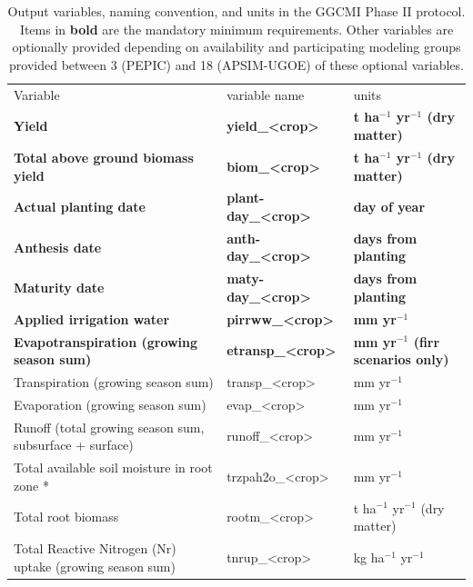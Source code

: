 \documentclass[gmd, manuscript]{copernicus} %
\begin{document}
\begin{table}[]
\caption{Output variables, naming convention, and units in the GGCMI Phase II protocol. Items in \textbf{bold} are the mandatory minimum requirements. Other variables are optionally provided depending on availability and participating modeling groups provided between 3 (PEPIC) and 18 (APSIM-UGOE) of these optional variables.}
\begin{tabular}{lll}
        \tophline \vspace{1mm}
Variable                                & variable name             & units \\
\middlehline \vspace{1mm}
\textbf{Yield}                                   & \textbf{yield\_<crop>}     & \textbf{t ha$^{-1}$ yr$^{-1}$ (dry matter)}\\
\textbf{Total above ground biomass yield}        & \textbf{biom\_<crop>}      & \textbf{t ha$^{-1}$ yr$^{-1}$ (dry matter)}\\
\textbf{Actual planting date}                    & \textbf{plant-day\_<crop>} & \textbf{day of year}\\
\textbf{Anthesis date}                           & \textbf{anth-day\_<crop>}  & \textbf{days from planting} \\
\textbf{Maturity date}                           & \textbf{maty-day\_<crop>}  & \textbf{days from planting}\\
\textbf{Applied irrigation water}                & \textbf{pirrww\_<crop>}    & \textbf{mm yr$^{-1}$} \\
\textbf{Evapotranspiration (growing season sum)} & \textbf{etransp\_<crop>}   & \textbf{mm yr$^{-1}$ (firr scenarios only)}\\ \middlehline
Transpiration (growing season sum)                       & transp\_<crop>    & mm yr$^{-1}$ \\
Evaporation (growing season sum)                         & evap\_<crop>      & mm yr$^{-1}$ \\
Runoff (total growing season sum, subsurface + surface)  & runoff\_<crop>    & mm yr$^{-1}$                    \\
Total available soil moisture in root zone *             & trzpah2o\_<crop>  & mm yr$^{-1}$                    \\
Total root biomass                                       & rootm\_<crop>     & t ha$^{-1}$ yr$^{-1}$ (dry matter)  \\
Total Reactive Nitrogen (Nr) uptake (growing season sum) & tnrup\_<crop>     & kg ha$^{-1}$ yr$^{-1}$              \\

\end{tabular}
\end{table}
\end{document}
